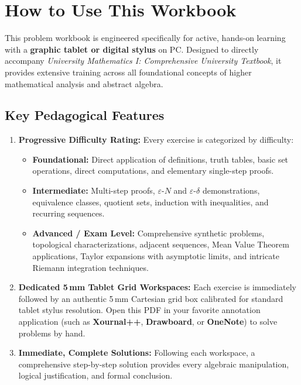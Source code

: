 \documentclass[11pt,oneside,openany]{book}
\begin{document}
\frontmatter
\pagestyle{plain}

\chapter*{How to Use This Workbook}

This problem workbook is engineered specifically for active, hands-on learning with a \textbf{graphic tablet or digital stylus} on PC. Designed to directly accompany \emph{University Mathematics I: Comprehensive University Textbook}, it provides extensive training across all foundational concepts of higher mathematical analysis and abstract algebra.

\section*{Key Pedagogical Features}

\begin{enumerate}[leftmargin=1.8em,itemsep=5pt]
  \item \textbf{Progressive Difficulty Rating:} Every exercise is categorized by difficulty:
  \begin{itemize}[leftmargin=1.5em,itemsep=2pt]
    \item[$\bigstar$] \textbf{Foundational:} Direct application of definitions, truth tables, basic set operations, direct computations, and elementary single-step proofs.
    \item[$\bigstar\bigstar$] \textbf{Intermediate:} Multi-step proofs, $\varepsilon$-$N$ and $\varepsilon$-$\delta$ demonstrations, equivalence classes, quotient sets, induction with inequalities, and recurring sequences.
    \item[$\bigstar\bigstar\bigstar$] \textbf{Advanced / Exam Level:} Comprehensive synthetic problems, topological characterizations, adjacent sequences, Mean Value Theorem applications, Taylor expansions with asymptotic limits, and intricate Riemann integration techniques.
  \end{itemize}
  \item \textbf{Dedicated 5\,mm Tablet Grid Workspaces:} Each exercise is immediately followed by an authentic 5\,mm Cartesian grid box calibrated for standard tablet stylus resolution. Open this PDF in your favorite annotation application (such as \textbf{Xournal++}, \textbf{Drawboard}, or \textbf{OneNote}) to solve problems by hand.
  \item \textbf{Immediate, Complete Solutions:} Following each workspace, a comprehensive step-by-step solution provides every algebraic manipulation, logical justification, and formal conclusion.
\end{enumerate}

\tableofcontents

\mainmatter
\pagestyle{fancy}







\end{document}
